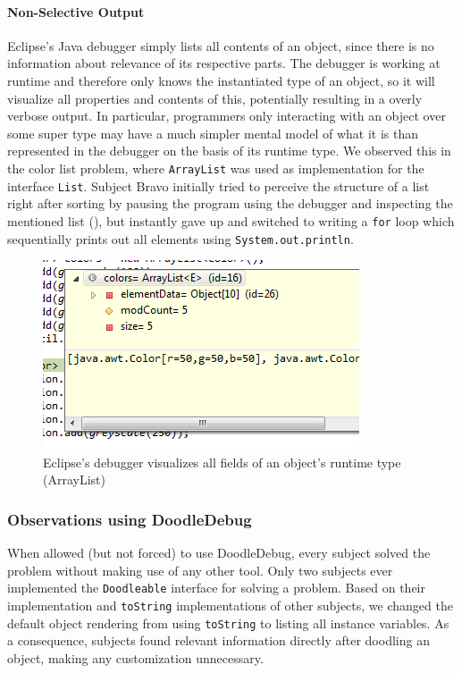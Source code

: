 \documentclass[english]{scrartcl}
\newcommand{\DD}{Dood\-le\-De\-bug\xspace}
\newcommand{\println}{\texttt{Sys\-tem.\-out.\-println}\xspace}
\begin{document}
\paragraph{Non-Selective Output}
Eclipse's Java debugger simply lists all contents of an object, since there is no information about relevance of its respective parts.
The debugger is working at runtime and therefore only knows the instantiated type of an object, so it will visualize all properties and contents of this, potentially resulting in a overly verbose output.
In particular, programmers only interacting with an object over some super type may have a much simpler mental model of what it is than represented in the debugger on the basis of its runtime type.
We observed this in the color list problem, where \texttt{ArrayList}
was used as implementation for the interface \texttt{List}.
Subject Bravo initially tried to perceive the structure of a list right after sorting by pausing the program  using the debugger and inspecting the mentioned list (), but instantly gave up and switched to writing a \texttt{for} loop which sequentially prints out all elements using \println.

\begin{figure}[h]
	\includegraphics[width=\linewidth]{img/debugger_color-list_remo.png}
	\caption[Bravo using the debugger for a color list]{Eclipse's debugger visualizes all fields of an object's runtime type (ArrayList)}
\end{figure}

\subsubsection{Observations using \DD}
When allowed (but not forced) to use \DD, every subject solved the problem without making use of any other tool.
Only two subjects ever implemented the \texttt{Doodleable} interface for solving a problem.
Based on their implementation and \texttt{toString} implementations of other subjects, we changed the default object rendering from using \texttt{toString} to listing all instance variables.
As a consequence, subjects found relevant information directly after doodling an object, making any customization unnecessary.
\end{document}
